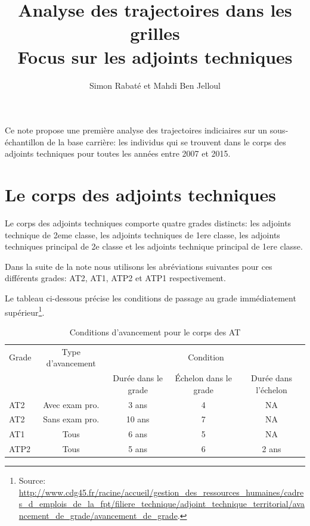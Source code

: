 \documentclass[11pt,a4paper]{article}
\begin{document}
\title{Analyse des trajectoires dans les grilles \\ Focus sur les adjoints techniques}


\author{Simon Rabat\'e et Mahdi Ben Jelloul}


\maketitle

Ce note propose une première analyse des trajectoires indiciaires sur un sous-échantillon de la base carrière: les individus qui se trouvent dans le corps des adjoints techniques pour toutes les années entre 2007 et 2015. 

\renewcommand*\contentsname{\textsc{Plan de la note}}
\tableofcontents

\clearpage


\section{Le corps des adjoints techniques}

Le corps des adjoints techniques comporte quatre grades distincts: les adjoints technique de 2eme classe, les adjoints techniques de 1ere classe, les adjoints techniques principal de 2e classe et les adjoints technique principal de 1ere classe. 

Dans la suite de la note nous utilisons les abréviations suivantes pour ces différents grades: AT2, AT1, ATP2 et ATP1 respectivement. 

Le tableau ci-dessous précise les conditions de passage au grade immédiatement supérieur\footnote{Source: \url{http://www.cdg45.fr/racine/accueil/gestion_des_ressources_humaines/cadres_d_emplois_de_la_fpt/filiere_technique/adjoint_technique_territorial/avancement_de_grade/avancement_de_grade}.}. 



\begin{table}[h!]
\label{means}
\centering
\caption{Conditions d'avancement pour le corps des AT} 
\begin{tabular}{l|c|ccc}
\toprule
 Grade  & Type d'avancement&  \multicolumn{3}{c}{Condition}  \\
		&  				   &  Durée dans le grade	&  Échelon	dans le grade & Durée dans l'échelon \\
\midrule
AT2  &	Avec exam pro. 	&   3 ans  & 	4  & NA \\
AT2  &	Sans exam pro. 	& 	10 ans &	7  &	NA \\
AT1  & Tous				& 	6 ans  &	5  &	NA \\
ATP2 & Tous				& 	5 ans  &	6  &	2 ans  \\	
%	
\bottomrule
\end{tabular}
\end{table}
\end{document}
